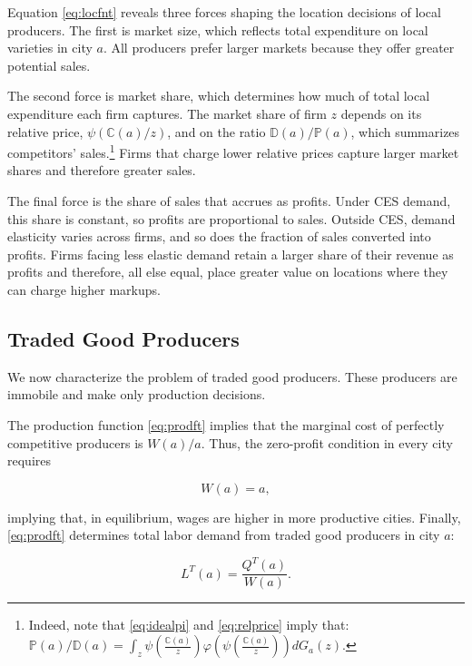 Equation \eqref{eq:locfnt} reveals three forces shaping the location decisions of local producers. The first is market size, which reflects total expenditure on local varieties in city $a$. All producers prefer larger markets because they offer greater potential sales.

The second force is market share, which determines how much of total local expenditure each firm captures. The market share of firm $z$ depends on its relative price, $\psi\left(\mathbb{C}(a)/z\right)$, and on the ratio $\mathbb{D}(a)/\mathbb{P}(a)$, which summarizes competitors’ sales.\footnote{Indeed, note that \eqref{eq:idealpi} and \eqref{eq:relprice} imply that: $\mathbb{P}(a)/\mathbb{D}(a) = \int_{z} \psi\left(\frac{\mathbb{C}(a)}{z}\right) \varphi\left(\psi\left(\frac{\mathbb{C}(a)}{z}\right)\right) dG_a(z)$.} Firms that charge lower relative prices capture larger market shares and therefore greater sales.

The final force is the share of sales that accrues as profits. Under CES demand, this share is constant, so profits are proportional to sales. Outside CES, demand elasticity varies across firms, and so does the fraction of sales converted into profits. Firms facing less elastic demand retain a larger share of their revenue as profits and therefore, all else equal, place greater value on locations where they can charge higher markups.

\subsection{Traded Good Producers}
We now characterize the problem of traded good producers. These producers are immobile and make only production decisions.

The production function \eqref{eq:prodft} implies that the marginal cost of perfectly competitive producers is $W(a)/a$. Thus, the zero-profit condition in every city requires  

\begin{equation}\label{eq:zeroprof}
	W(a) = a,
\end{equation}

implying that, in equilibrium, wages are higher in more productive cities. Finally, \eqref{eq:prodft} determines total labor demand from traded good producers in city $a$:  

\begin{equation}\label{eq:ltrade}
	L^T(a) =  \frac{Q^T(a)}{W(a)}.
\end{equation}


